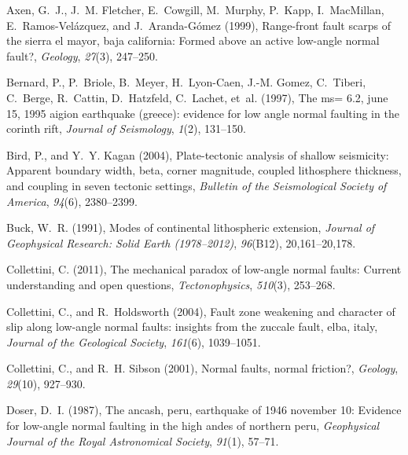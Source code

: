 \documentclass[draft,grl]{AGUTeX}
\begin{document}
\begin{article}
\begin{thebibliography}{29}
Axen, G.~J., J.~M. Fletcher, E.~Cowgill, M.~Murphy, P.~Kapp, I.~MacMillan,
  E.~Ramos-Vel{\'a}zquez, and J.~Aranda-G{\'o}mez (1999), Range-front fault
  scarps of the sierra el mayor, baja california: Formed above an active
  low-angle normal fault?, \textit{Geology}, \textit{27}(3), 247--250.

Bernard, P., P.~Briole, B.~Meyer, H.~Lyon-Caen, J.-M. Gomez, C.~Tiberi,
  C.~Berge, R.~Cattin, D.~Hatzfeld, C.~Lachet, et~al. (1997), The ms= 6.2, june
  15, 1995 aigion earthquake (greece): evidence for low angle normal faulting
  in the corinth rift, \textit{Journal of Seismology}, \textit{1}(2), 131--150.

Bird, P., and Y.~Y. Kagan (2004), Plate-tectonic analysis of shallow
  seismicity: Apparent boundary width, beta, corner magnitude, coupled
  lithosphere thickness, and coupling in seven tectonic settings,
  \textit{Bulletin of the Seismological Society of America}, \textit{94}(6),
  2380--2399.

Buck, W.~R. (1991), Modes of continental lithospheric extension,
  \textit{Journal of Geophysical Research: Solid Earth (1978--2012)},
  \textit{96}(B12), 20,161--20,178.

Collettini, C. (2011), The mechanical paradox of low-angle normal faults:
  Current understanding and open questions, \textit{Tectonophysics},
  \textit{510}(3), 253--268.

Collettini, C., and R.~Holdsworth (2004), Fault zone weakening and character of
  slip along low-angle normal faults: insights from the zuccale fault, elba,
  italy, \textit{Journal of the Geological Society}, \textit{161}(6),
  1039--1051.

Collettini, C., and R.~H. Sibson (2001), Normal faults, normal friction?,
  \textit{Geology}, \textit{29}(10), 927--930.

Doser, D.~I. (1987), The ancash, peru, earthquake of 1946 november 10: Evidence
  for low-angle normal faulting in the high andes of northern peru,
  \textit{Geophysical Journal of the Royal Astronomical Society},
  \textit{91}(1), 57--71.


\end{thebibliography}
\end{article}
\end{document}
